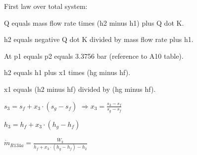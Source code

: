 First law over total system:  

Q equals mass flow rate times (h2 minus h1) plus Q dot K.  

h2 equals negative Q dot K divided by mass flow rate plus h1.  

At p1 equals p2 equals 3.3756 bar (reference to A10 table).  

h2 equals h1 plus x1 times (hg minus hf).  

x1 equals (h2 minus hf) divided by (hg minus hf).

\( s_3 = s_f + x_3 \cdot (s_g - s_f) \)  
\( \Rightarrow x_3 = \frac{s_3 - s_f}{s_g - s_f} \)  

\( h_3 = h_f + x_3 \cdot (h_g - h_f) \)  

\( \dot{m}_{R134a} = \frac{\dot{W}_k}{h_f + x_3 \cdot (h_g - h_f) - h_2} \)